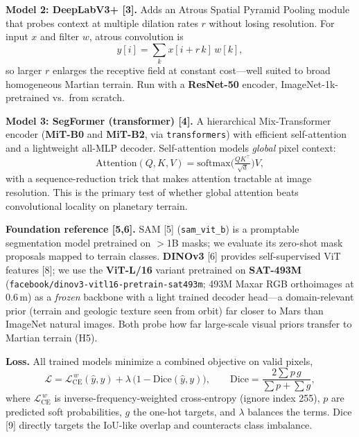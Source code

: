 \documentclass[11pt]{article}
\begin{document}
\smallskip\noindent\textbf{Model 2: DeepLabV3+ [3].} Adds an Atrous Spatial Pyramid Pooling module
that probes context at multiple dilation rates $r$ without losing resolution. For input $x$ and
filter $w$, atrous convolution is
\[
y[i] = \sum_{k} x[i + r\,k]\,w[k],
\]
so larger $r$ enlarges the receptive field at constant cost---well suited to broad homogeneous Martian
terrain. Run with a \textbf{ResNet-50} encoder, ImageNet-1k-pretrained vs.\ from scratch.

\smallskip\noindent\textbf{Model 3: SegFormer (transformer) [4].} A hierarchical Mix-Transformer
encoder (\textbf{MiT-B0} and \textbf{MiT-B2}, via \texttt{transformers}) with efficient self-attention
and a lightweight all-MLP decoder. Self-attention models \emph{global} pixel context:
\[
\mathrm{Attention}(Q,K,V) = \mathrm{softmax}\!\Big(\tfrac{Q K^{\top}}{\sqrt{d}}\Big)V,
\]
with a sequence-reduction trick that makes attention tractable at image resolution. This is the
primary test of whether global attention beats convolutional locality on planetary terrain.

\smallskip\noindent\textbf{Foundation reference [5,6].} SAM [5] (\texttt{sam\_vit\_b}) is a promptable
segmentation model pretrained on $>$1B masks; we evaluate its zero-shot mask proposals mapped to
terrain classes. \textbf{DINOv3} [6] provides self-supervised ViT features [8]; we use the
\textbf{ViT-L/16} variant pretrained on \textbf{SAT-493M}
(\texttt{facebook/dinov3-vitl16-pretrain-sat493m}; 493M Maxar RGB orthoimages at 0.6\,m) as a
\emph{frozen} backbone with a light trained decoder head---a domain-relevant prior (terrain and
geologic texture seen from orbit) far closer to Mars than ImageNet natural images. Both probe how far
large-scale visual priors transfer to Martian terrain (H5).

\smallskip\noindent\textbf{Loss.} All trained models minimize a combined objective on valid pixels,
\[
\mathcal{L} = \mathcal{L}_{\mathrm{CE}}^{\,w}(\hat{y}, y) + \lambda\,\big(1 - \mathrm{Dice}(\hat{y}, y)\big),
\qquad
\mathrm{Dice} = \frac{2\sum p\,g}{\sum p + \sum g},
\]
where $\mathcal{L}_{\mathrm{CE}}^{\,w}$ is inverse-frequency-weighted cross-entropy (ignore index
255), $p$ are predicted soft probabilities, $g$ the one-hot targets, and $\lambda$ balances the
terms. Dice [9] directly targets the IoU-like overlap and counteracts class imbalance.
\end{document}
